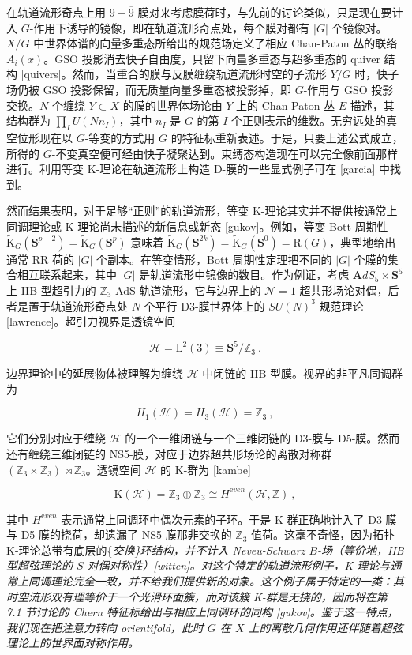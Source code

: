 \documentclass[11pt,a4paper]{ctexart}
\begin{document}
在轨道流形奇点上用 \(9-\overline{9}\) 膜对来考虑膜荷时，与先前的讨论类似，只是现在要计入 \(G\)-作用下诱导的镜像，即在轨道流形奇点处，每个膜对都有 \(|G|\) 个镜像对。\(X/G\) 中世界体谱的向量多重态所给出的规范场定义了相应 Chan-Paton 丛的联络 \(A_i(x)\)。GSO 投影消去快子自由度，只留下向量多重态与超多重态的 quiver 结构 [quivers]。然而，当重合的膜与反膜缠绕轨道流形时空的子流形 \(Y/G\) 时，快子场仍被 GSO 投影保留，而无质量向量多重态被投影掉，即 \(G\)-作用与 GSO 投影交换。\(N\) 个缠绕 \(Y\subset X\) 的膜的世界体场论由 \(Y\) 上的 Chan-Paton 丛 \(E\) 描述，其结构群为 \(\prod_{I}U(Nn_I)\)，其中 \(n_I\) 是 \(G\) 的第 \(I\) 个正则表示的维数。无穷远处的真空位形现在以 \(G\)-等变的方式用 \(G\) 的特征标重新表述。于是，只要上述公式成立，所得的 \(G\)-不变真空便可经由快子凝聚达到。束缚态构造现在可以完全像前面那样进行。利用等变 K-理论在轨道流形上构造 D-膜的一些显式例子可在 [garcia] 中找到。

然而结果表明，对于足够``正则''的轨道流形，等变 K-理论其实并不提供按通常上同调理论或 K-理论尚未描述的新信息或新态 [gukov]。例如，等变 Bott 周期性 \(\widetilde{{\mathrm K}}_G({\mathbf S}^{p+2})=\widetilde{{\mathrm K}}_G({\mathbf S}^p)\) 意味着 \(\widetilde{{\mathrm K}}_G({\mathbf S}^{2k})=\widetilde{{\mathrm K}}_G({\mathbf S}^{0})={\mathrm R}(G)\)，典型地给出通常 RR 荷的 \(|G|\) 个副本。在等变情形，Bott 周期性定理把不同的 \(|G|\) 个膜的集合相互联系起来，其中 \(|G|\) 是轨道流形中镜像的数目。作为例证，考虑 \({\mathbf AdS}_5\times {\mathbf S}^5\) 上 IIB 型超引力的 \({\mathbb{Z}}_3\) AdS-轨道流形，它与边界上的 \({\mathcal N}=1\) 超共形场论对偶，后者是置于轨道流形奇点处 \(N\) 个平行 D3-膜世界体上的 \(SU(N)^3\) 规范理论 [lawrence]。超引力视界是透镜空间

\[{\mathcal H}={\mathrm L}^2(3)\equiv{\mathbf S}^5/{\mathbb{Z}}_3\ .\]

边界理论中的延展物体被理解为缠绕 \({\mathcal H}\) 中闭链的 IIB 型膜。视界的非平凡同调群为

\[H_1({\mathcal H})=H_3({\mathcal H})={\mathbb{Z}}_3\ ,\]

它们分别对应于缠绕 \({\mathcal H}\) 的一个一维闭链与一个三维闭链的 D3-膜与 D5-膜。然而还有缠绕三维闭链的 NS5-膜，对应于边界超共形场论的离散对称群 \(({\mathbb{Z}}_3\times{\mathbb{Z}}_3)\,\rtimes{\mathbb{Z}}_3\)。透镜空间 \({\mathcal H}\) 的 K-群为 [kambe]

\[{\mathrm K}({\mathcal H})={\mathbb{Z}}_3\oplus{\mathbb{Z}}_3\cong H^{\mathrm even}({\mathcal H},{\mathbb{Z}})\ ,\]

其中 \(H^{\mathrm even}\) 表示通常上同调环中偶次元素的子环。于是 K-群正确地计入了 D3-膜与 D5-膜的挠荷，却遗漏了 NS5-膜那非交换的 \({\mathbb{Z}}_3\) 值荷。这毫不奇怪，因为拓扑 K-理论总带有底层的\{\it 交换\}环结构，并不计入 Neveu-Schwarz \(B\)-场（等价地，IIB 型超弦理论的 \(S\)-对偶对称性）[witten]。对这个特定的轨道流形例子，K-理论与通常上同调理论完全一致，并不给我们提供新的对象。这个例子属于特定的一类：其时空流形双有理等价于一个光滑环面簇，而对该簇 K-群是无挠的，因而将在第 7.1 节讨论的 Chern 特征标给出与相应上同调环的同构 [gukov]。鉴于这一特点，我们现在把注意力转向 orientifold，此时 \(G\) 在 \(X\) 上的离散几何作用还伴随着超弦理论上的世界面对称作用。
\end{document}
